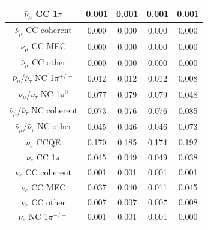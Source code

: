 \begin{table}
\begin{tabular} { | c ||c | c | c | c |  | }
$\bar{\nu}_\mu$ CC 1$\pi$                         & 0.001               & 0.001               & 0.001               & 0.001                \\ \hline 
$\bar{\nu}_\mu$ CC coherent                       & 0.000               & 0.000               & 0.000               & 0.000                \\ \hline 
$\bar{\nu}_\mu$ CC MEC                            & 0.000               & 0.000               & 0.000               & 0.000                \\ \hline 
$\bar{\nu}_\mu$ CC other                          & 0.000               & 0.000               & 0.000               & 0.000                \\ \hline 
$\bar{\nu}_\mu$/$\bar{\nu}_\tau$ NC 1$\pi^{+/-}$  & 0.012               & 0.012               & 0.012               & 0.008                \\ \hline 
$\bar{\nu}_\mu$/$\bar{\nu}_\tau$ NC 1$\pi^0$      & 0.077               & 0.079               & 0.079               & 0.048                \\ \hline 
$\bar{\nu}_\mu$/$\bar{\nu}_\tau$ NC coherent      & 0.073               & 0.076               & 0.076               & 0.085                \\ \hline 
$\bar{\nu}_\mu$/$\bar{\nu}_\tau$ NC other         & 0.045               & 0.046               & 0.046               & 0.073                \\ \hline 
$\nu_e$ CCQE                                      & 0.170               & 0.185               & 0.174               & 0.192                \\ \hline 
$\nu_e$ CC 1$\pi$                                 & 0.045               & 0.049               & 0.049               & 0.038                \\ \hline 
$\nu_e$ CC coherent                               & 0.001               & 0.001               & 0.001               & 0.001                \\ \hline 
$\nu_e$ CC MEC                                    & 0.037               & 0.040               & 0.011               & 0.045                \\ \hline 
$\nu_e$ CC other                                  & 0.007               & 0.007               & 0.007               & 0.008                \\ \hline 
$\nu_e$ NC 1$\pi^{+/-}$                           & 0.001               & 0.001               & 0.001               & 0.000                \\ \hline 

\end{tabular}
\end{table}
